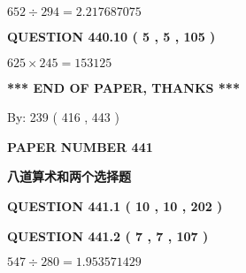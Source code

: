\documentclass{ctexart}
\begin{document}
 

$ %
652 \div  %
294=   %
2.217687075$
 
 
  
\vspace{0.2in}
  
{\textbf{\Large{QUESTION
440.10 
 ( 5 , 5 , 105 )
}}}
  
  
 
 

$ %
625 \times  %
245=   %
153125$
 
 
   
   
 \vspace{0.2in}
 
   
   
   
   
\vspace{1.0in} 
{\textbf{\large{ *** END OF PAPER, THANKS *** }}} 
   
   
\hspace{1.0in} By: 
 239 ( 416 ,  443 )
   
   
   
   
\newpage 
\setcounter{page}{ 
   441001 } 
   
   
   
   
 {\textbf{ \Large{ PAPER NUMBER  441  }}}
   
   
\vspace{0.2in}
   
   
   
   
   
   
 \vspace{0.2in}
{\LARGE {\textbf{ 八道算术和两个选择题}}}
   
   
  
\vspace{0.2in}
  
{\textbf{\Large{QUESTION
441.1 
 ( 10 , 10 , 202 )
}}}
  
  
  
\vspace{0.2in}
  
{\textbf{\Large{QUESTION
441.2 
 ( 7 , 7 , 107 )
}}}
  
  
 
 

$ %
547 \div  %
280=   %
1.953571429$
 
 
  
\vspace{0.2in}
  
\end{document}
